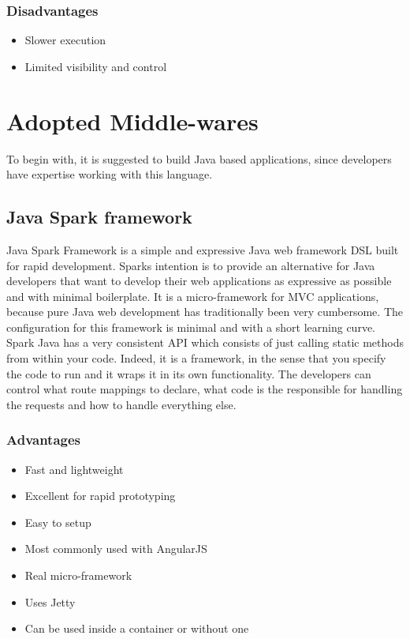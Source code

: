 \documentclass[a4paper, hidelinks, 12pt]{report}
\begin{document}
\subsubsection{Disadvantages}
\begin{itemize}
\item{} Slower execution
\item{} Limited visibility and control
\end{itemize}

	\section{Adopted Middle-wares}
	To begin with, it is suggested to build Java based applications, since developers have expertise working with this language.

\subsection{Java Spark framework}
Java Spark Framework is a simple and expressive Java web framework DSL built for rapid development. Sparks intention is to provide an alternative for Java developers that want to develop their web applications as expressive as possible and with minimal boilerplate. It is a micro-framework for MVC applications, because pure Java web development has traditionally been very cumbersome. The configuration for this framework is minimal and with a short learning curve.\\

Spark Java has a very consistent API which consists of just calling static methods from within your code. Indeed, it is a framework, in the sense that you specify the code to run and it wraps it in its own functionality. The developers can control what route mappings to declare, what code is the responsible for handling the requests and how to handle everything else.

\subsubsection{Advantages}
		\begin{itemize}
		\item{} Fast and lightweight
	\item{} Excellent for rapid prototyping
	\item{} Easy to setup
	\item{} Most commonly used with AngularJS
	\item{} Real micro-framework
	\item{} Uses Jetty
	\item{} Can be used inside a container or without one
		\end{itemize}
\end{document}
